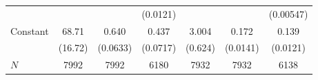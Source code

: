 {\begin{tabular}{l*{6}{c}}
            &                     &                     &    (0.0121)         &                     &                     &   (0.00547)         \\
Constant    &       68.71\sym{***}&       0.640\sym{***}&       0.437\sym{***}&       3.004\sym{***}&       0.172\sym{***}&       0.139\sym{***}\\
            &     (16.72)         &    (0.0633)         &    (0.0717)         &     (0.624)         &    (0.0141)         &    (0.0121)         \\
\hline
\(N\)       &        7992         &        7992         &        6180         &        7932         &        7932         &        6138         \\
\hline\hline
\end{tabular}
}

